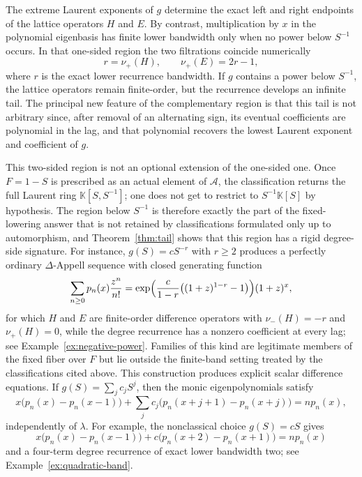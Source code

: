 \documentclass[11pt,reqno]{amsart}
\numberwithin{equation}{section}
\theoremstyle{definition}
\theoremstyle{remark}
\newcommand{\K}{\mathbb K}
\newcommand{\algA}{\mathcal A}
\begin{document}
The extreme Laurent exponents of $g$ determine the exact left and right endpoints of the lattice operators $H$ and $E$.  By contrast, multiplication by $x$ in the polynomial eigenbasis has finite lower bandwidth only when no power below $S^{-1}$ occurs.  In that one-sided region the two filtrations coincide numerically
\begin{equation}\label{eq:intro-stencil-bandwidth}
 r=\nu_+(H),
 \qquad
 \nu_+(E)=2r-1,
\end{equation}
where $r$ is the exact lower recurrence bandwidth.  If $g$ contains a power below $S^{-1}$, the lattice operators remain finite-order, but the recurrence develops an infinite tail.  The principal new feature of the complementary region is that this tail is not arbitrary since, after removal of an alternating sign, its eventual coefficients are polynomial in the lag, and that polynomial recovers the lowest Laurent exponent and coefficient of $g$.

This two-sided region is not an optional extension of the one-sided one.  Once $F=1-S$ is prescribed as an actual element of $\algA$, the classification returns the full Laurent ring $\K[S,S^{-1}]$; one does not get to restrict to $S^{-1}\K[S]$ by hypothesis. The region below $S^{-1}$ is therefore exactly the part of the fixed-lowering answer that is not retained by classifications formulated only up to automorphism, and Theorem~\ref{thm:tail} shows that this region has a rigid degree-side signature. For instance, $g(S)=cS^{-r}$ with $r\ge2$ produces a perfectly ordinary $\Delta$-Appell sequence with closed generating function
\[
 \sum_{n\ge0}p_n(x)\frac{z^n}{n!}
 =\exp\Bigl(\frac{c}{1-r}\bigl((1+z)^{1-r}-1\bigr)\Bigr)(1+z)^x,
\]
for which $H$ and $E$ are finite-order difference operators with $\nu_-(H)=-r$ and $\nu_+(H)=0$, while the degree recurrence has a nonzero coefficient at every lag; see Example~\ref{ex:negative-power}.  Families of this kind are legitimate members of the fixed fiber over $F$ but lie outside the finite-band setting treated by the classifications cited above. This construction produces explicit scalar difference equations.  If $g(S)=\sum_jc_jS^j$, then the monic eigenpolynomials satisfy
\begin{equation}\label{eq:intro-difference-equation}
 x\bigl(p_n(x)-p_n(x-1)\bigr)
 +\sum_j c_j\bigl(p_n(x+j+1)-p_n(x+j)\bigr)
 =np_n(x),
\end{equation}
independently of $\lambda$.  For example, the nonclassical choice $g(S)=cS$ gives
\[
 x\bigl(p_n(x)-p_n(x-1)\bigr)
 +c\bigl(p_n(x+2)-p_n(x+1)\bigr)=np_n(x)
\]
and a four-term degree recurrence of exact lower bandwidth two; see Example~\ref{ex:quadratic-band}.
\end{document}
